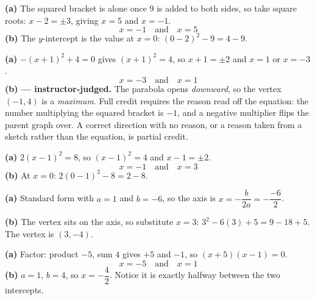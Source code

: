 \documentclass[12pt]{article}
\begin{document}




\textbf{(a)} The squared bracket is alone once $9$ is added to both sides, so take square roots: $x - 2 = \pm 3$, giving $x = 5$ and $x = -1$.
\[ \boxed{x = -1 \quad \text{and} \quad x = 5} \]
\textbf{(b)} The $y$-intercept is the value at $x = 0$: $(0-2)^2 - 9 = 4 - 9$. 


\textbf{(a)} $-(x+1)^2 + 4 = 0$ gives $(x+1)^2 = 4$, so $x + 1 = \pm 2$ and $x = 1$ or $x = -3$.
\[ \boxed{x = -3 \quad \text{and} \quad x = 1} \]
\textbf{(b) --- instructor-judged.} The parabola opens \emph{downward}, so the vertex $(-1, 4)$ is a \emph{maximum}. Full credit requires the reason read off the equation: the number multiplying the squared bracket is $-1$, and a negative multiplier flips the parent graph over. A correct direction with no reason, or a reason taken from a sketch rather than the equation, is partial credit.


\textbf{(a)} $2(x-1)^2 = 8$, so $(x-1)^2 = 4$ and $x - 1 = \pm 2$.
\[ \boxed{x = -1 \quad \text{and} \quad x = 3} \]
\textbf{(b)} At $x = 0$: $2(0-1)^2 - 8 = 2 - 8$. 


\textbf{(a)} Standard form with $a = 1$ and $b = -6$, so the axis is $x = -\dfrac{b}{2a} = -\dfrac{-6}{2}$. 

\textbf{(b)} The vertex sits on the axis, so substitute $x = 3$: $3^2 - 6(3) + 5 = 9 - 18 + 5$. The vertex is $(3, -4)$. 


\textbf{(a)} Factor: product $-5$, sum $4$ gives $+5$ and $-1$, so $(x+5)(x-1) = 0$.
\[ \boxed{x = -5 \quad \text{and} \quad x = 1} \]
\textbf{(b)} $a = 1$, $b = 4$, so $x = -\dfrac{4}{2}$. Notice it is exactly halfway between the two intercepts. 

\end{document}
